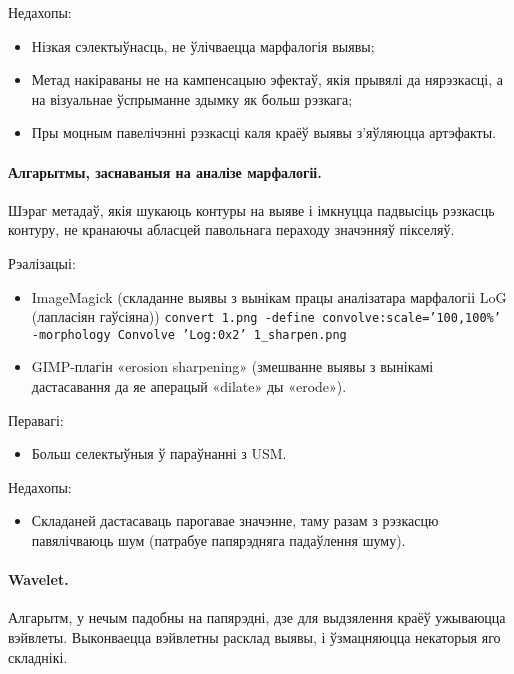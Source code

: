 \documentclass[10pt, a5paper]{article}
\begin{document}
Недахопы:

\begin{itemize}
  \item Нізкая сэлектыўнасць, не ўлічваецца марфалогія выявы;
  \item Метад накіраваны не на кампенсацыю эфектаў, якія прывялі да нярэзкасці, а на візуальнае ўспрыманне здымку як больш рэзкага;
  \item Пры моцным павелічэнні рэзкасці каля краёў выявы \linebreak з’яўляюцца артэфакты.
\end{itemize}

\paragraph*{Алгарытмы, заснаваныя на аналізе марфалогіі.} Шэраг метадаў, якія шукаюць контуры на выяве і імкнуцца падвысіць рэзкасць контуру, не кранаючы абласцей павольнага пераходу значэнняў пікселяў.

Рэалізацыі:
\begin{itemize}
  \item ImageMagick (складанне выявы з вынікам працы аналізатара марфалогіі LoG (лапласіян гаўсіяна)\cite{litv1})
\texttt{convert 1.png \linebreak -define convolve:scale='100,100\%' -morphology Convolve 'Log:0x2' 1\_sharpen.png}
\end{itemize}

\begin{itemize}
  \item GIMP-плагін «erosion sharpening» (змешванне выявы з вынікамі дастасавання да яе аперацый «dilate» ды «erode»).
\end{itemize}

Перавагі:
\begin{itemize}
  \item Больш селектыўныя ў параўнанні з USM.
\end{itemize}

Недахопы:
\begin{itemize}
  \item Складаней дастасаваць парогавае значэнне, таму разам з рэзкасцю павялічваюць шум (патрабуе папярэдняга падаўлення шуму).
\end{itemize}

\paragraph*{Wavelet.} Алгарытм, у нечым падобны на папярэдні, дзе для выдзялення краёў ужываюцца вэйвлеты. Выконваецца вэйвлетны расклад выявы, і ўзмацняюцца некаторыя яго складнікі.
\end{document}
